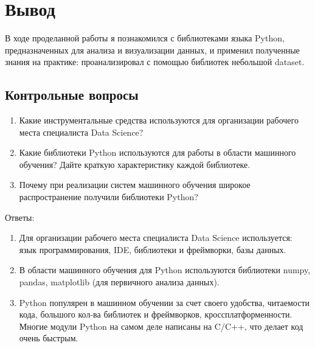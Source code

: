 \chapter{Вывод}
\label{ch:chap3}

В ходе проделанной работы я познакомился с библиотеками языка Python, предназначенных для анализа и визуализации данных, и применил
полученные знания на практике: проанализировал с помощью библиотек небольшой dataset.

\section{Контрольные вопросы}

\begin{enumerate} 
    \item Какие инструментальные средства используются для организации рабочего места специалиста Data Science? 
    \item Какие библиотеки Python используются для работы в области машинного обучения? Дайте краткую характеристику каждой библиотеке.
    \item Почему при реализации систем машинного обучения широкое распространение получили библиотеки Python?
\end{enumerate}

Ответы:

\begin{enumerate}
    \item Для организации рабочего места специалиста Data Science используется: язык программирования, IDE, библиотеки и фреймворки, базы данных. 
    \item В области машинного обучения для Python используются библиотеки numpy, pandas, matplotlib (для первичного анализа данных).
    \item Python популярен в машинном обучении за счет своего удобства, читаемости кода, большого кол-ва библиотек и фреймворков, кроссплатформенности. Многие модули Python на самом деле написаны на C/C++, что делает код очень быстрым.
\end{enumerate}

\endinput